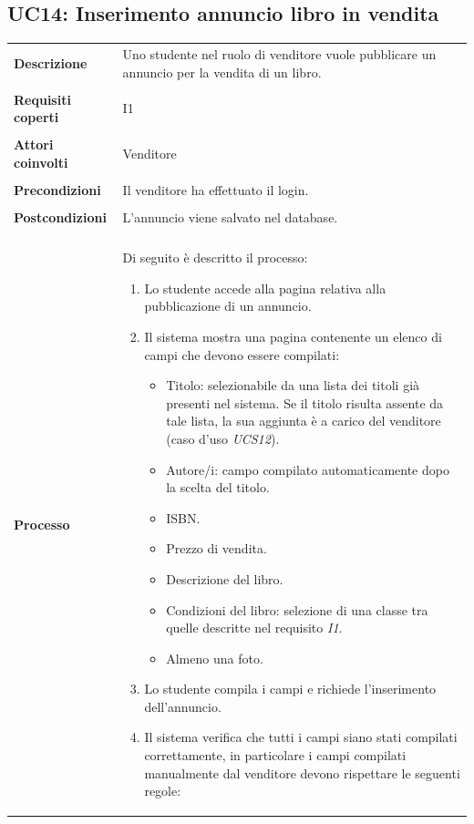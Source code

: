 \documentclass[10pt,a4paper]{report}
\begin{document}
	
	\subsection{UC14: Inserimento annuncio libro in vendita}
	\begin{tabular}{lp{}}
		\textbf{Descrizione}&Uno studente nel ruolo di venditore vuole pubblicare un annuncio per la vendita di un libro.\\
		\\
		\textbf{Requisiti coperti}&I1\\
		\\
		\textbf{Attori coinvolti}&Venditore\\
		\\
		\textbf{Precondizioni}&Il venditore ha effettuato il login.\\
		\\
		\textbf{Postcondizioni}&L'annuncio viene salvato nel database.\\
		\\
		\textbf{Processo}&Di seguito è descritto il processo:
		\begin{enumerate}
			\item Lo studente accede alla pagina relativa alla pubblicazione di un annuncio.
			\item Il sistema mostra una pagina contenente un elenco di campi che devono essere compilati:
			\begin{itemize}
				\item Titolo: selezionabile da una lista dei titoli già presenti nel sistema. Se il titolo risulta assente da tale lista, la sua aggiunta è a carico del venditore (caso d'uso \textit{UCS12}).
				\item Autore/i: campo compilato automaticamente dopo la scelta del titolo.
				\item ISBN.
				\item Prezzo di vendita.
				\item Descrizione del libro.
				\item Condizioni del libro: selezione di una classe tra quelle descritte nel requisito \textit{I1}.
				\item Almeno una foto.
			\end{itemize}
			\item Lo studente compila i campi e richiede l'inserimento dell'annuncio.
			\item Il sistema verifica che tutti i campi siano stati compilati correttamente, in particolare i campi compilati manualmente dal venditore devono rispettare le seguenti regole:

\end{enumerate}
\end{tabular}
\end{document}
